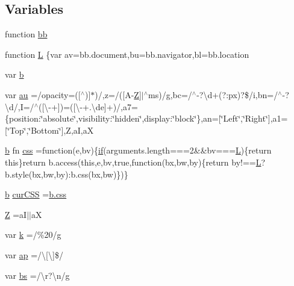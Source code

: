 \subsection*{Variables}
\begin{DoxyCompactItemize}
\item 
function \hyperlink{a00039_a1d6558865876e1c8cca029fce41a4bdb}{bb}
\item 
function \hyperlink{a00039_a38ee4c0b5f4fe2a18d0c783af540d253}{L} \{var av=bb.\+document,bu=bb.\+navigator,bl=bb.\+location
\item 
var \hyperlink{a00039_aa4026ad5544b958e54ce5e106fa1c805}{b}
\item 
var \hyperlink{a00039_a4fd8ddfab07c8d7c7cae0ab0e052cad3}{au} =/opacity=(\mbox{[}$^\wedge$)\mbox{]}$\ast$)/,z=/(\mbox{[}A-\/\hyperlink{a00039_adc18d83abfd9f87d396e8fd6b6ac0fe1}{Z}\mbox{]}$\vert$$^\wedge$ms)/g,bc=/$^\wedge$-\/?\textbackslash{}d+(?\+:px)?\$/i,bn=/$^\wedge$-\/?\textbackslash{}d/,I=/$^\wedge$(\mbox{[}\textbackslash{}-\/+\mbox{]})=(\mbox{[}\textbackslash{}-\/+.\textbackslash{}de\mbox{]}+)/,a7=\{position\+:\char`\"{}absolute\char`\"{},visibility\+:\char`\"{}hidden\char`\"{},display\+:\char`\"{}block\char`\"{}\},an=\mbox{[}\char`\"{}Left\char`\"{},\char`\"{}Right\char`\"{}\mbox{]},a1=\mbox{[}\char`\"{}Top\char`\"{},\char`\"{}Bottom\char`\"{}\mbox{]},Z,a\+I,a\+X
\item 
\hyperlink{a00039_a2fa551895933fae935a0a6b87282241d}{b} fn \hyperlink{a00039_a89ad527fcd82c01ebb587332f5b4fcd4}{css} =function(e,bv)\{\hyperlink{a00039_a42cbfadee2b4749e8f699ea8d745a0e4}{if}(arguments.\+length===2\&\&bv===\hyperlink{a00039_a38ee4c0b5f4fe2a18d0c783af540d253}{L})\{return this\}return b.\+access(this,e,bv,true,function(bx,bw,by)\{return by!==\hyperlink{a00039_a38ee4c0b5f4fe2a18d0c783af540d253}{L}?b.\+style(bx,bw,by)\+:b.\+css(bx,bw)\})\}
\item 
\hyperlink{a00039_a2fa551895933fae935a0a6b87282241d}{b} \hyperlink{a00039_a88b21f8ba3af86d6981b1da520ece33b}{cur\+C\+S\+S} =\hyperlink{a00039_a89ad527fcd82c01ebb587332f5b4fcd4}{b.\+css}
\item 
\hyperlink{a00039_adc18d83abfd9f87d396e8fd6b6ac0fe1}{Z} =a\+I$\vert$$\vert$a\+X
\item 
var \hyperlink{a00039_ab26645c014aa005ecedef329ecf58c99}{k} =/\%20/g
\item 
var \hyperlink{a00039_a6ddf393cc7f9a8828e197bb0d9916c44}{ap} =/\textbackslash{}\mbox{[}\textbackslash{}\mbox{]}\$/
\item 
var \hyperlink{a00039_ae77642f8ef73fb9c20c2a737d956acda}{bs} =/\textbackslash{}r?\textbackslash{}n/g

\end{DoxyCompactItemize}
